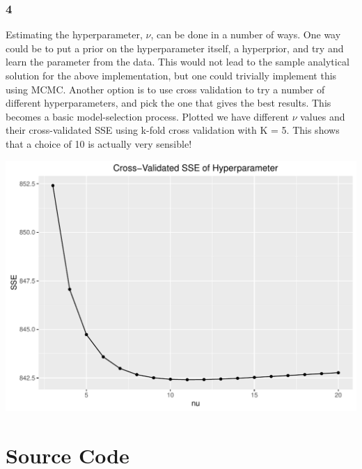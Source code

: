 \documentclass[a4paper,12pt]{article}\usepackage[]{graphicx}\usepackage[]{color}
\makeatletter
\def\maxwidth{ %
  \ifdim\Gin@nat@width>\linewidth
    \linewidth
  \else
    \Gin@nat@width
  \fi
}
\newenvironment{knitrout}{}{} %
\makeatother
\begin{document}
\subsubsection*{4}

Estimating the hyperparameter, $\nu$, can be done in a number of ways. One way could be to put a prior on the hyperparameter itself, a hyperprior, and try and learn the parameter from the data. This would not lead to the sample analytical solution for the above implementation, but one could trivially implement this using MCMC.  Another option is to use cross validation to try a number of different hyperparameters, and pick the one that gives the best results. This becomes a basic model-selection process. Plotted we have different $\nu$ values and their cross-validated SSE using k-fold cross validation with K = 5. This shows that a choice of 10 is actually very sensible!

\begin{knitrout}
\color{fgcolor}
\includegraphics[width=\maxwidth]{figure/nu-1} 

\end{knitrout}

\appendix
\section{Source Code}
\end{document}
